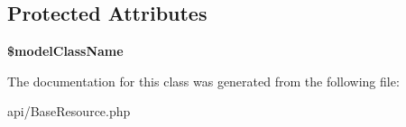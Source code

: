\subsection*{Protected Attributes}
\begin{DoxyCompactItemize}
\item 
\hypertarget{classDMA_1_1Friends_1_1Api_1_1GenericModelRepository_a24215ef1696b0dedaf385b16f03ea000}{{\bfseries \$model\-Class\-Name}}\label{classDMA_1_1Friends_1_1Api_1_1GenericModelRepository_a24215ef1696b0dedaf385b16f03ea000}

\end{DoxyCompactItemize}


The documentation for this class was generated from the following file\-:\begin{DoxyCompactItemize}
\item 
api/Base\-Resource.\-php\end{DoxyCompactItemize}
